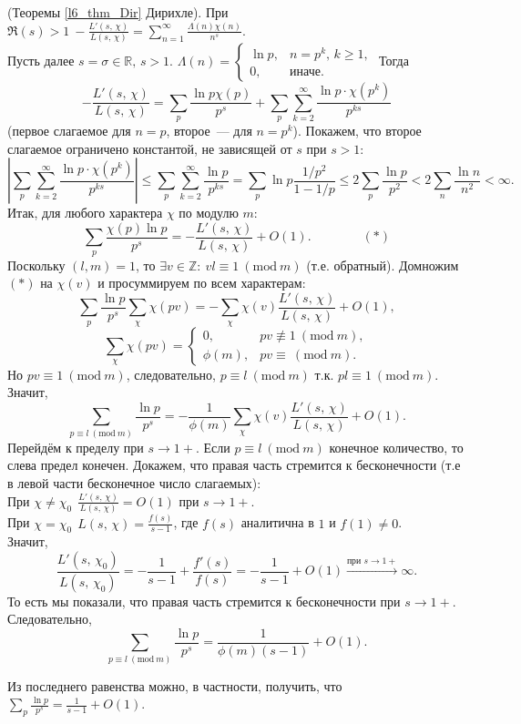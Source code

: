 \begin{pf} (Теоремы \ref{l6_thm_Dir} Дирихле).
	При $\displaystyle \Re(s)>1 \ -\frac{L'(s,\,\chi)}{L(s,\,\chi)} = \sum\limits_{n=1}^\infty \frac{\Lambda(n)\chi(n)}{n^s}$.\\
	Пусть далее $s=\sigma \in \mathbb{R}, \, s>1$. $\Lambda(n) =
	\begin{cases}
		\ln p, & n=p^k,\,k\geq1,\\
		0, & \text{иначе.}
	\end{cases}$
	Тогда
	$$-\frac{L'(s,\,\chi)}{L(s,\,\chi)} = \sum\limits_p \frac{\ln p \chi(p)}{p^s} + \sum\limits_p \sum\limits_{k=2}^\infty \frac{\ln p \cdot \chi\left( p^k \right)}{p^{ks}}$$ (первое слагаемое для $n=p$, второе — для $n=p^k$). Покажем, что второе слагаемое ограничено константой, не зависящей от $s$ при $s>1$:
	$$\left| \sum\limits_p \sum\limits_{k=2}^\infty \frac{\ln p \cdot \chi\left( p^k \right)}{p^{ks}} \right| \leq \sum\limits_p \sum\limits_{k=2}^\infty \frac{\ln p}{p^{ks}} = \sum\limits_p \ln p \frac{1/p^2}{1-1/p} \leq 2\sum\limits_p \frac{\ln p}{p^2} < 2\sum\limits_n \frac{\ln n}{n^2} < \infty.$$
	Итак, для любого характера $\chi$ по модулю $m$:
	$$\sum\limits_p \frac{\chi(p)\ln p}{p^s} = -\frac{L'(s,\,\chi)}{L(s,\,\chi)} + O(1). \qquad \qquad (\ast)$$
	Поскольку $(l, m) =1$, то $\exists v \in \mathbb{Z}: \ vl \equiv 1 \ (\mathrm{mod} \ m)$ (т.е. обратный).
	Домножим $(\ast)$ на $\chi(v)$ и просуммируем по всем характерам:
	$$\sum\limits_p \frac{\ln p}{p^s} \sum\limits_\chi \chi(pv) = -\sum\limits_\chi \chi(v)\frac{L'(s,\,\chi)}{L(s,\,\chi)} + O(1),$$
	$$\sum\limits_\chi \chi(pv) =
	\begin{cases}
		0, & pv \not\equiv 1 \ (\mathrm{mod} \ m),\\
		\phi(m), & pv \equiv \ (\mathrm{mod} \ m).
	\end{cases}$$
	Но $pv \equiv 1 \ (\mathrm{mod} \ m)$, следовательно, $p \equiv l \ (\mathrm{mod} \ m)$ т.к. $pl \equiv 1 \ (\mathrm{mod} \ m)$. Значит,
	$$\sum\limits_{p \equiv l \ (\mathrm{mod} \ m)} \frac{\ln p}{p^s} = -\frac{1}{\phi(m)} \sum\limits_\chi \chi(v)\frac{L'(s,\,\chi)}{L(s,\,\chi)} + O(1).$$
	Перейдём к пределу при $s \to 1+$. Если $p \equiv l \ (\mathrm{mod} \ m)$ конечное количество, то слева предел конечен. Докажем, что правая часть стремится к бесконечности (т.е в левой части бесконечное число слагаемых):\\
	При $\displaystyle \chi \ne \chi_0 \ \ \frac{L'(s,\,\chi)}{L(s,\,\chi)} = O(1)$ при $s \to 1+$.\\
	При $\displaystyle \chi = \chi_0 \ \ L(s,\,\chi) = \frac{f(s)}{s-1}$, где $f(s)$ аналитична в $1$ и $f(1) \ne 0$.\\
	Значит,
	$$\frac{L'(s,\,\chi_0)}{L(s,\,\chi_0)} = -\frac{1}{s-1} + \frac{f'(s)}{f(s)} = -\frac{1}{s-1} + O(1) \xrightarrow{\text{при } s\to1+} \infty.$$
	То есть мы показали, что правая часть стремится к бесконечности при $s \to 1+$. Следовательно,
	$$\sum\limits_{p \equiv l \ (\mathrm{mod} \ m)} \frac{\ln p}{p^s} = \frac{1}{\phi(m)(s-1)} + O(1).$$
\end{pf}
Из последнего равенства можно, в частности, получить, что $\displaystyle \sum\limits_p \frac{\ln p}{p^s} = \frac{1}{s-1} + O(1)$.\\


